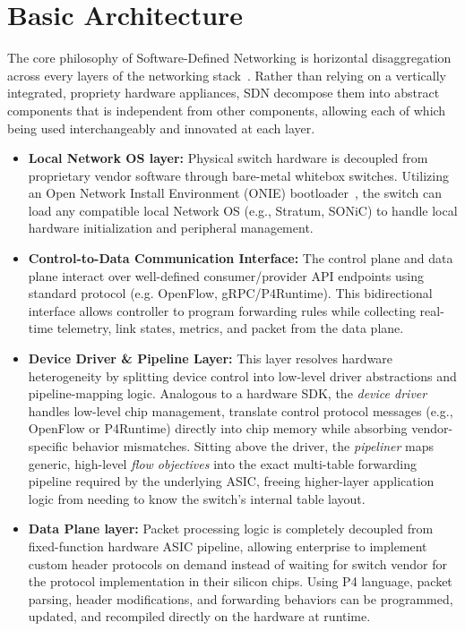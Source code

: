 \section{Basic Architecture}\label{sec:basic-architecture}
The core philosophy of Software-Defined Networking is horizontal disaggregation across every layers of the networking stack~\cite{systemsapproach}. Rather than relying on a vertically integrated, propriety hardware appliances, SDN decompose them into abstract components that is independent from other components, allowing each of which being used interchangeably and innovated at each layer.
\begin{itemize}
    \item \textbf{Local Network OS layer:} Physical switch hardware is decoupled from proprietary vendor software through bare-metal whitebox switches. Utilizing an Open Network Install Environment (ONIE) bootloader~\cite{onie}, the switch can load any compatible local Network OS (e.g., Stratum, SONiC) to handle local hardware initialization and peripheral management.
    \item \textbf{Control-to-Data Communication Interface:} The control plane and data plane interact over well-defined consumer/provider API endpoints using standard protocol (e.g. OpenFlow, gRPC/P4Runtime). This bidirectional interface allows controller to program forwarding rules while collecting real-time telemetry, link states, metrics, and packet from the data plane.
    \item \textbf{Device Driver \& Pipeline Layer:} This layer resolves hardware heterogeneity by splitting device control into low-level driver abstractions and pipeline-mapping logic. Analogous to a hardware SDK, the \textit{device driver} handles low-level chip management, translate control protocol messages (e.g., OpenFlow or P4Runtime) directly into chip memory while absorbing vendor-specific behavior mismatches. Sitting above the driver, the \textit{pipeliner} maps generic, high-level \textit{flow objectives} into the exact multi-table forwarding pipeline required by the underlying ASIC, freeing higher-layer application logic from needing to know the switch's internal table layout.
    \item \textbf{Data Plane layer: } Packet processing logic is completely decoupled from fixed-function hardware ASIC pipeline, allowing enterprise to implement custom header protocols on demand instead of waiting for switch vendor for the protocol implementation in their silicon chips. Using P4 language, packet parsing, header modifications, and forwarding behaviors can be programmed, updated, and recompiled directly on the hardware at runtime.
\end{itemize}
